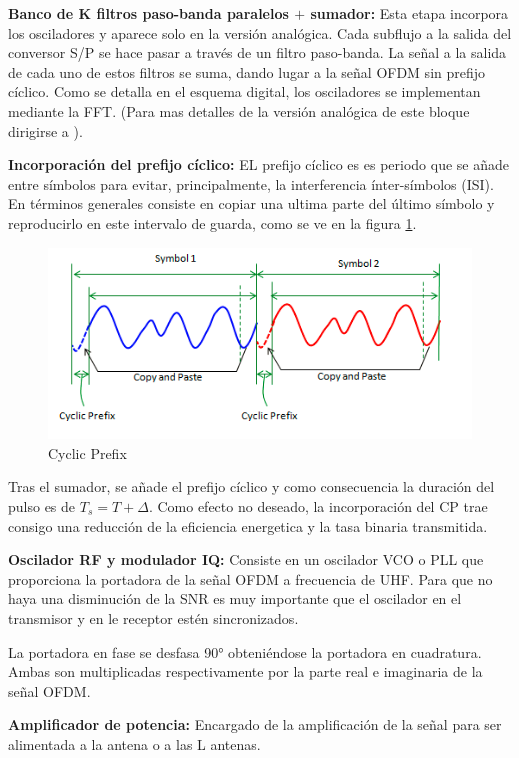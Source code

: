 \documentclass[a4paper,12pt]{report} %
\begin{document}
\textbf{Banco de K filtros paso-banda paralelos $+$ sumador:} Esta etapa incorpora los osciladores y aparece solo en la versión analógica. Cada subflujo  a la salida del conversor S/P se hace pasar a través de un filtro
paso-banda. La señal a la salida de cada uno de estos filtros se suma, dando lugar a la señal
OFDM sin prefijo cíclico.
Como se detalla en el esquema digital, los osciladores se implementan mediante la FFT. (Para mas detalles de la versión analógica de este bloque dirigirse a \cite{tesis}).

\textbf{Incorporación del prefijo cíclico:} EL prefijo cíclico es es periodo que se añade entre símbolos para evitar, principalmente, la interferencia ínter-símbolos (ISI). En términos generales consiste en copiar una ultima parte del último símbolo y reproducirlo en este intervalo de guarda, como se ve en la figura \ref{CP}.

\begin{figure}[H]
	\centering
	\includegraphics[scale=1]{imagenes/arquitectura/CP}
	\caption{Cyclic Prefix}
	\label{CP}
\end{figure}

Tras el sumador, se añade el prefijo cíclico y como consecuencia la duración del pulso es de $T_s = T + \Delta$. Como efecto no deseado, la incorporación del CP trae consigo una reducción de la eficiencia energetica y la tasa binaria transmitida.

\textbf{Oscilador RF y modulador IQ:} Consiste en un oscilador VCO o PLL que proporciona la portadora de la señal OFDM a frecuencia de UHF. Para que no haya una disminución de la SNR es muy importante que el oscilador en el transmisor y en le receptor estén sincronizados.

La portadora en fase se desfasa 90° obteniéndose la portadora en cuadratura. Ambas son multiplicadas respectivamente por la parte real e imaginaria de la señal OFDM.

\textbf{Amplificador de potencia:} Encargado de la amplificación de la señal para ser alimentada a la antena o a las L antenas.
\end{document}
